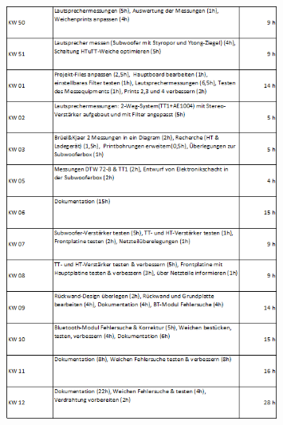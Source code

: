 \begin{figure} [H]
	\centering
	\includegraphics[width=0.8\textwidth]{form/ArbeitsnachweisMacsek2von3.png}
\end{figure}
